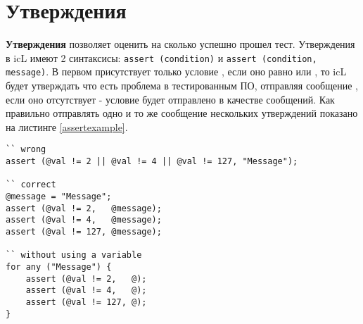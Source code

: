 \section{Утверждения}

{\bf Утверждения} позволяет оценить на сколько успешно прошел тест. Утверждения в icL имеют 2 синтаксисы: \lstinline|assert (condition)| и \lstinline|assert (condition, message)|. В первом присутствует только условие , если оно равно \false{} или \void, то icL будет утверждать что есть проблема в тестированным ПО, отправляя сообщение , если оно отсутствует - условие будет отправлено в качестве сообщений. Как правильно отправлять одно и то же сообщение нескольких утверждений показано на листинге \ref{assertexample}.

\begin{lstlisting}[caption=Пример использования утверждениях, label=assertexample]
`` wrong
assert (@val != 2 || @val != 4 || @val != 127, "Message");

`` correct
@message = "Message";
assert (@val != 2,   @message);
assert (@val != 4,   @message);
assert (@val != 127, @message);

`` without using a variable
for any ("Message") {
	assert (@val != 2,   @);
	assert (@val != 4,   @);
	assert (@val != 127, @);
}
\end{lstlisting}
